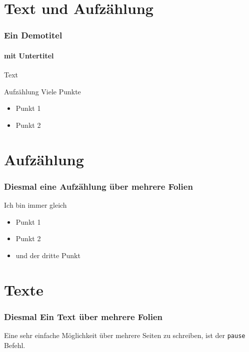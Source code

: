 \documentclass[xcolor=dvipsnames]{beamer}
\subtitle{Modul ABC01} %
\institute{AKAD Pinneberg} %
\title{\Title}
\author{\Author}
\date{\today}
\begin{document}
\begin{frame}
    \titlepage
\end{frame}


\frame{\tableofcontents} 

 
\section{Text und Aufzählung}
\begin{frame} %
  \frametitle{Ein Demotitel} %
  \framesubtitle{mit Untertitel} %
  \begin{block}{} 
    Text
  \end{block}
  \begin{block}{Aufzählung}
  	Viele Punkte
	  \begin{itemize}
  		\item Punkt 1
	  	\item Punkt 2
	  \end{itemize}
  \end{block}
\end{frame}


\section{Aufzählung}
\begin{frame}
  \frametitle{Diesmal eine Aufzählung über mehrere Folien}
	\begin{block}{Ich bin immer gleich}	
		\begin{itemize}[<+->]
			\item Punkt 1
			\item Punkt 2
			\item und der dritte Punkt
		\end{itemize}
	\end{block}
\end{frame}

\section{Texte}
\begin{frame}
  \frametitle{Diesmal Ein Text über mehrere Folien}
	Eine \pause sehr einfache Möglichkeit \pause über mehrere Seiten zu schreiben, \pause ist der  \texttt{pause} Befehl.
\end{frame}
\end{document}
